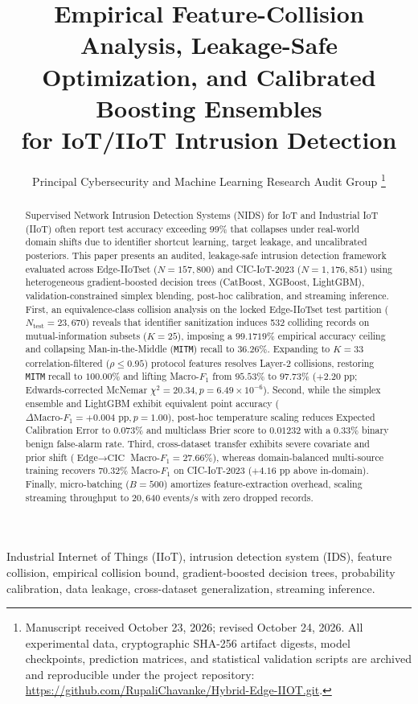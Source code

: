 \documentclass[10pt,journal,twocolumn]{IEEEtran}
\title{Empirical Feature-Collision Analysis, Leakage-Safe\\Optimization, and Calibrated Boosting Ensembles\\for IoT/IIoT Intrusion Detection}
\author{Principal Cybersecurity and Machine Learning Research Audit Group%
\thanks{Manuscript received October 23, 2026; revised October 24, 2026. All experimental data, cryptographic SHA-256 artifact digests, model checkpoints, prediction matrices, and statistical validation scripts are archived and reproducible under the project repository: \url{https://github.com/RupaliChavanke/Hybrid-Edge-IIOT.git}.}}
\begin{document}
\maketitle

\begin{abstract}
Supervised Network Intrusion Detection Systems (NIDS) for IoT and Industrial IoT (IIoT) often report test accuracy exceeding 99\% that collapses under real-world domain shifts due to identifier shortcut learning, target leakage, and uncalibrated posteriors. This paper presents an audited, leakage-safe intrusion detection framework evaluated across Edge-IIoTset ($N=157,800$) and CIC-IoT-2023 ($N=1,176,851$) using heterogeneous gradient-boosted decision trees (CatBoost, XGBoost, LightGBM), validation-constrained simplex blending, post-hoc calibration, and streaming inference. First, an equivalence-class collision analysis on the locked Edge-IIoTset test partition ($N_{\text{test}}=23,670$) reveals that identifier sanitization induces 532 colliding records on mutual-information subsets ($K=25$), imposing a $99.1719\%$ empirical accuracy ceiling and collapsing Man-in-the-Middle (\texttt{MITM}) recall to $36.26\%$. Expanding to $K=33$ correlation-filtered ($\rho \le 0.95$) protocol features resolves Layer-2 collisions, restoring \texttt{MITM} recall to $100.00\%$ and lifting Macro-$F_1$ from $95.53\%$ to $97.73\%$ ($+2.20\text{ pp}$; Edwards-corrected McNemar $\chi^2 = 20.34, p = 6.49 \times 10^{-6}$). Second, while the simplex ensemble and LightGBM exhibit equivalent point accuracy ($\Delta\text{Macro-}F_1 = +0.004\text{ pp}, p = 1.00$), post-hoc temperature scaling reduces Expected Calibration Error to $0.073\%$ and multiclass Brier score to $0.01232$ with a $0.33\%$ binary benign false-alarm rate. Third, cross-dataset transfer exhibits severe covariate and prior shift ($\text{Edge}\to\text{CIC}$ Macro-$F_1 = 27.66\%$), whereas domain-balanced multi-source training recovers $70.32\%$ Macro-$F_1$ on CIC-IoT-2023 ($+4.16\text{ pp}$ above in-domain). Finally, micro-batching ($B=500$) amortizes feature-extraction overhead, scaling streaming throughput to $20,640\text{ events/s}$ with zero dropped records.
\end{abstract}

\begin{IEEEkeywords}
Industrial Internet of Things (IIoT), intrusion detection system (IDS), feature collision, empirical collision bound, gradient-boosted decision trees, probability calibration, data leakage, cross-dataset generalization, streaming inference.
\end{IEEEkeywords}
\end{document}
